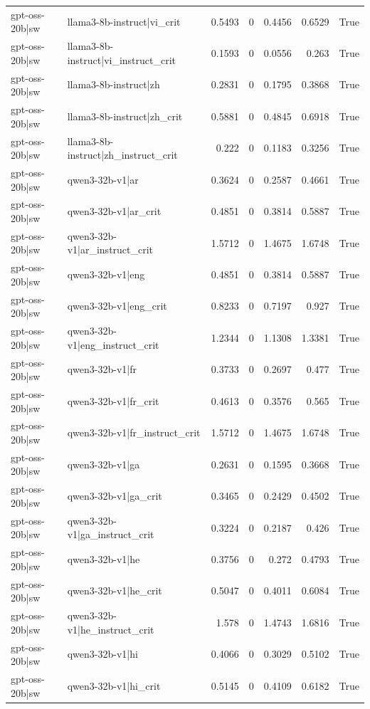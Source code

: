 \begin{table}
\begin{tabular}{l l r r r r l}
gpt-oss-20b|sw & llama3-8b-instruct|vi_crit & 0.5493 & 0 & 0.4456 & 0.6529 & True \\
gpt-oss-20b|sw & llama3-8b-instruct|vi_instruct_crit & 0.1593 & 0 & 0.0556 & 0.263 & True \\
gpt-oss-20b|sw & llama3-8b-instruct|zh & 0.2831 & 0 & 0.1795 & 0.3868 & True \\
gpt-oss-20b|sw & llama3-8b-instruct|zh_crit & 0.5881 & 0 & 0.4845 & 0.6918 & True \\
gpt-oss-20b|sw & llama3-8b-instruct|zh_instruct_crit & 0.222 & 0 & 0.1183 & 0.3256 & True \\
gpt-oss-20b|sw & qwen3-32b-v1|ar & 0.3624 & 0 & 0.2587 & 0.4661 & True \\
gpt-oss-20b|sw & qwen3-32b-v1|ar_crit & 0.4851 & 0 & 0.3814 & 0.5887 & True \\
gpt-oss-20b|sw & qwen3-32b-v1|ar_instruct_crit & 1.5712 & 0 & 1.4675 & 1.6748 & True \\
gpt-oss-20b|sw & qwen3-32b-v1|eng & 0.4851 & 0 & 0.3814 & 0.5887 & True \\
gpt-oss-20b|sw & qwen3-32b-v1|eng_crit & 0.8233 & 0 & 0.7197 & 0.927 & True \\
gpt-oss-20b|sw & qwen3-32b-v1|eng_instruct_crit & 1.2344 & 0 & 1.1308 & 1.3381 & True \\
gpt-oss-20b|sw & qwen3-32b-v1|fr & 0.3733 & 0 & 0.2697 & 0.477 & True \\
gpt-oss-20b|sw & qwen3-32b-v1|fr_crit & 0.4613 & 0 & 0.3576 & 0.565 & True \\
gpt-oss-20b|sw & qwen3-32b-v1|fr_instruct_crit & 1.5712 & 0 & 1.4675 & 1.6748 & True \\
gpt-oss-20b|sw & qwen3-32b-v1|ga & 0.2631 & 0 & 0.1595 & 0.3668 & True \\
gpt-oss-20b|sw & qwen3-32b-v1|ga_crit & 0.3465 & 0 & 0.2429 & 0.4502 & True \\
gpt-oss-20b|sw & qwen3-32b-v1|ga_instruct_crit & 0.3224 & 0 & 0.2187 & 0.426 & True \\
gpt-oss-20b|sw & qwen3-32b-v1|he & 0.3756 & 0 & 0.272 & 0.4793 & True \\
gpt-oss-20b|sw & qwen3-32b-v1|he_crit & 0.5047 & 0 & 0.4011 & 0.6084 & True \\
gpt-oss-20b|sw & qwen3-32b-v1|he_instruct_crit & 1.578 & 0 & 1.4743 & 1.6816 & True \\
gpt-oss-20b|sw & qwen3-32b-v1|hi & 0.4066 & 0 & 0.3029 & 0.5102 & True \\
gpt-oss-20b|sw & qwen3-32b-v1|hi_crit & 0.5145 & 0 & 0.4109 & 0.6182 & True \\

\end{tabular}
\end{table}
